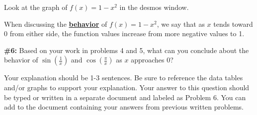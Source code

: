 \documentclass[handout,nooutcomes]{ximera}
\begin{document}
Look at the graph of $f(x)=1-x^2$ in the desmos window. 

When discussing the \underline{\textbf{behavior}} of $f(x)=1-x^2$, we say that as $x$ tends toward 0 from either side, the function values increase from more negative values to 1.

\underline{\hspace{5in}}

\begin{problem}{\textbf{\#6:}}
Based on your work in problems 4 and 5, what can you conclude about the behavior of $\sin\left(\frac{1}{x}\right)$ and $\cos\left(\frac{\pi}{x}\right)$ as $x$ approaches 0?

Your explanation should be 1-3 sentences. Be sure to reference the data tables and/or graphs to support your explanation. Your answer to this question should be typed or written in a separate document and labeled as Problem 6. You can add to the document containing your answers from previous written problems.

\end{problem}
\end{document}
